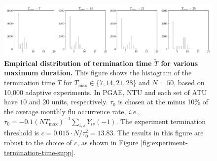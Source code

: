 {    \begin{figure}[t!]
    \centering
    \includegraphics[width=1\linewidth]{plots/empirical/flu/adaptive/flu_termination_time.pdf}
	\caption{\textbf{Empirical distribution of termination time $\tilde{T}$ for various maximum duration.} This figure shows the histogram of the termination time $\tilde{T}$ for $T_{\max} \in \{7,14,21,28\}$ and $N=50$, based on 10,000 adaptive experiments. 
	In PGAE, NTU and each set of ATU have $10$ and $20$ units, respectively. $\tau_0$ is chosen at the minus 10\% of the average monthly flu occurrence rate, {\it i.e.}, $\tau_0 = -0.1 (NT_{\max})^{-1} \sum_{i,s} Y_{is}(-1)$. The experiment termination threshold is $c = 0.015 \cdot N/\tau_0^2 = 13.83$. The results in this figure are robust to the choice of $c$, as shown in Figure \ref{fig:experiment-termination-time-supp}.
	}
	\label{fig:experiment-termination-time}
\end{figure}



}
